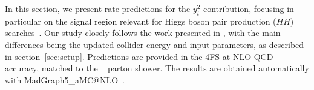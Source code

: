 \documentclass[11pt,a4paper]{article}
\begin{document}
%




In this section, we present rate predictions for the $y_t^2$ contribution, focusing in particular on the signal region relevant for Higgs boson pair production ($HH$) searches~\cite{HDBS-2021-18,CMS-HIG-22-001}. Our study closely follows the work presented in , with the main differences being the updated collider energy and input parameters, as described in section~\ref{sec:setup}. Predictions are provided in the 4FS at NLO QCD accuracy, matched to the ~\cite{Bierlich:2022pfr} parton shower. The results are obtained automatically with {\sc MadGraph5\_aMC@NLO}~\cite{Alwall:2014hca,Frederix:2018nkq}.
\end{document}
